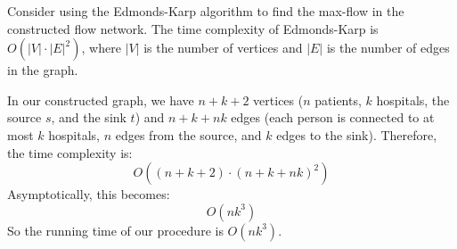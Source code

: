 \documentclass[12pt]{article}
\begin{document}
Consider using the Edmonds-Karp algorithm to find the max-flow in the constructed flow network. The time complexity of Edmonds-Karp is $O(|V| \cdot |E|^2)$, where $|V|$ is the number of vertices and $|E|$ is the number of edges in the graph.

In our constructed graph, we have $n + k + 2$ vertices ($n$ patients, $k$ hospitals, the source $s$, and the sink $t$) and $n + k + nk$ edges (each person is connected to at most $k$ hospitals, $n$ edges from the source, and $k$ edges to the sink). Therefore, the time complexity is:
$$
    O((n+k+2)\cdot(n+k+nk)^2)
$$
Asymptotically, this becomes:
$$
O(nk^3)
$$
So the running time of our procedure is $O(nk^3)$.
\end{document}
